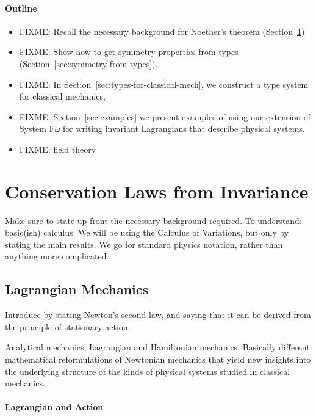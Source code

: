 \documentclass[preprint]{sigplanconf}
\theoremstyle{examplestyle}
\begin{document}
\paragraph{Outline}

\begin{itemize}
\item FIXME: Recall the necessary background for Noether's theorem
  (Section~\ref{sec:conservation-laws-from-symmetry}).
\item FIXME: Show how to get symmetry properties from types
  (Section~\ref{sec:symmetry-from-types}).
\item FIXME: In Section~\ref{sec:types-for-classical-mech}, we
  construct a type system for classical mechanics,
\item FIXME: Section~\ref{sec:examples} we present examples of using
  our extension of System F$\omega$ for writing invariant Lagrangians
  that describe physical systems.
\item FIXME: field theory
\end{itemize}

\section{Conservation Laws from Invariance}
\label{sec:conservation-laws-from-symmetry}

Make sure to state up front the necessary background required. To
understand: basic(ish) calculus. We will be using the Calculus of
Variations, but only by stating the main results. We go for standard
physics notation, rather than anything more complicated.

\subsection{Lagrangian Mechanics}

Introduce by stating Newton's second law, and saying that it can be
derived from the principle of stationary action.

Analytical mechanics, Lagrangian and Hamiltonian mechanics. Basically
different mathematical reformulations of Newtonian mechanics that
yield new insights into the underlying structure of the kinds of
physical systems studied in classical mechanics. 

\paragraph{Lagrangian and Action}
\end{document}
